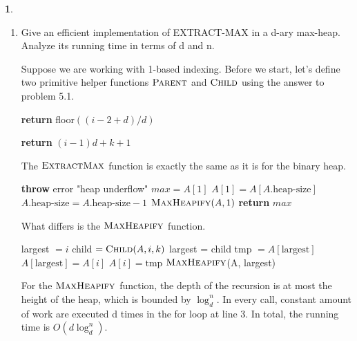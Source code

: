 \documentclass[11pt]{article}
\theoremstyle{definition}
\theoremstyle{theorem}
\newtheorem{prob}{}
\newcommand{\solution}{\medskip\noindent{\color{DarkBlue}\textbf{Solution:}}}
\begin{document}
\begin{prob}
\begin{enumerate}
\newpage
\item Give an efficient implementation of EXTRACT-MAX in a d-ary max-heap. Analyze its running time in terms of d and n.

\solution

Suppose we are working with 1-based indexing. Before we start, let's define two primitive helper functions $\textproc{\textsc{Parent}}$ and $\textproc{\textsc{Child}}$ using the answer to problem 5.1.

\begin{algorithmic}[1]
	\State \textbf{return} floor$((i-2+d)/d)$
\EndFunction
\end{algorithmic}

\begin{algorithmic}[1]
 
	\State \textbf{return} $(i-1)d + k + 1$
\EndFunction
\end{algorithmic}

The $\textproc{\textsc{ExtractMax}}$ function is exactly the same as it is for the binary heap.

\begin{algorithmic}[1]
		\State \textbf{throw} error "heap underflow"
	\EndIf
	\State $\textit{max} = A[1]$
	\State $A[1] = A[A.\text{heap-size}]$
	\State $A.\text{heap-size} = A.\text{heap-size} - 1$
	\State $\textproc{\textsc{MaxHeapify}}(A, 1)$
	\State \textbf{return} $\textit{max}$
\EndFunction
\end{algorithmic}

What differs is the $\textproc{\textsc{MaxHeapify}}$ function.

\begin{algorithmic}[1]
	\State largest $= i$
	 
		\State child $= \textproc{\textsc{Child}}(A, i, k)$
			\State largest = child
		\EndIf
	\EndFor
	 
		\State tmp $= A[\text{largest}]$
		\State $A[\text{largest}] = A[i]$
		\State $A[i] = \text{tmp}$
		\State $\textproc{\textsc{MaxHeapify}}$(A, largest) 
	\EndIf
\EndFunction
\end{algorithmic}
For the $\textproc{\textsc{MaxHeapify}}$ function, the depth of the recursion is at most the height of the heap, which is bounded by $\log_d^n$. In every call, constant amount of work are executed d times in the for loop at line 3. In total, the running time is $O(d\log_d^n)$.


\end{enumerate}
\end{prob}
\end{document}
